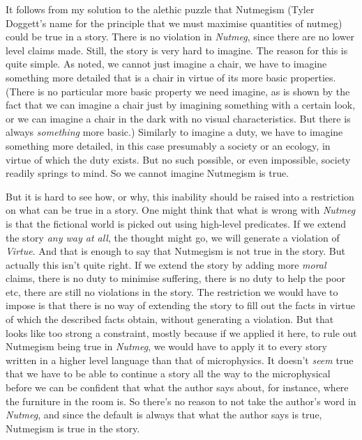 \documentclass[
  11pt,
  letterpaper,
  DIV=11,
  numbers=noendperiod,
  twoside]{scrartcl}
\begin{document}
It follows from my solution to the alethic puzzle that Nutmegism (Tyler
Doggett's name for the principle that we must maximise quantities of
nutmeg) could be true in a story. There is no violation in
\emph{Nutmeg}, since there are no lower level claims made. Still, the
story is very hard to imagine. The reason for this is quite simple. As
noted, we cannot just imagine a chair, we have to imagine something more
detailed that is a chair in virtue of its more basic properties. (There
is no particular more basic property we need imagine, as is shown by the
fact that we can imagine a chair just by imagining something with a
certain look, or we can imagine a chair in the dark with no visual
characteristics. But there is always \emph{something} more basic.)
Similarly to imagine a duty, we have to imagine something more detailed,
in this case presumably a society or an ecology, in virtue of which the
duty exists. But no such possible, or even impossible, society readily
springs to mind. So we cannot imagine Nutmegism is true.

But it is hard to see how, or why, this inability should be raised into
a restriction on what can be true in a story. One might think that what
is wrong with \emph{Nutmeg} is that the fictional world is picked out
using high-level predicates. If we extend the story \emph{any way at
all}, the thought might go, we will generate a violation of
\emph{Virtue}. And that is enough to say that Nutmegism is not true in
the story. But actually this isn't quite right. If we extend the story
by adding more \emph{moral} claims, there is no duty to minimise
suffering, there is no duty to help the poor etc, there are still no
violations in the story. The restriction we would have to impose is that
there is no way of extending the story to fill out the facts in virtue
of which the described facts obtain, without generating a violation. But
that looks like too strong a constraint, mostly because if we applied it
here, to rule out Nutmegism being true in \emph{Nutmeg}, we would have
to apply it to every story written in a higher level language than that
of microphysics. It doesn't \emph{seem} true that we have to be able to
continue a story all the way to the microphysical before we can be
confident that what the author says about, for instance, where the
furniture in the room is. So there's no reason to not take the author's
word in \emph{Nutmeg}, and since the default is always that what the
author says is true, Nutmegism is true in the story.
\end{document}
